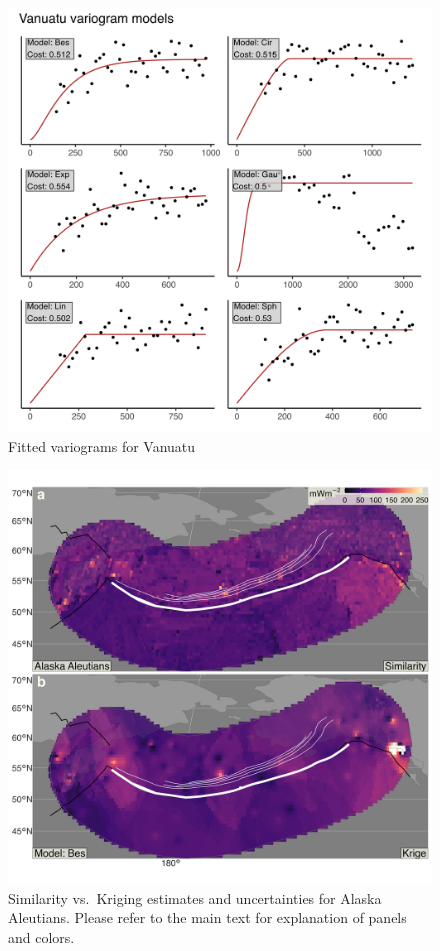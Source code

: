 \begin{figure}
\centering
\includegraphics{assets/figs/chpt3/VanuatuVgrms.png}
\caption[Fitted variograms for Vanuatu]{Fitted variograms for Vanuatu}
\end{figure}

\begin{figure}
\centering
\includegraphics{assets/figs/chpt3/AlaskaAleutiansDiffComp.png}
\caption[Similarity vs.~Kriging estimates and uncertainties for Alaska Aleutians]{Similarity vs.~Kriging estimates and uncertainties for Alaska Aleutians. Please refer to the main text for explanation of panels and colors.}
\end{figure}

